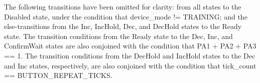 {\begin{center}
\begin{tikzpicture}[->,>=stealth',
      shorten >=1pt,
      node distance=42mm,
      auto,
      on grid,
      semithick]
  \end{tikzpicture}
\end{center}

The following transitions have been omitted for clarity: from all states
to the Disabled state, under the condition that device\_mode !=
TRAINING; and the else-transitions from the Inc, IncHold, Dec, and
DecHold states to the Ready state.  The transition conditions from the
Ready state to the Dec, Inc, and ConfirmWait states are also conjoined
with the condition that PA1 + PA2 + PA3 == 1.  The transition conditions
from the DecHold and IncHold states to the Dec and Inc states,
respectively, are also conjoined with the condition that tick\_count ==
BUTTON\_REPEAT\_TICKS.

}
